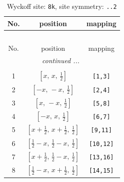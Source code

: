 \documentclass[fleqn,8pt]{jsarticle}
\begin{document}
\begin{longtable}{ccc}
\caption{Wyckoff site: {\tt 8k}, site symmetry: {\tt ..2}}
 \\
 \hline \hline
No. & position & mapping \\ \hline \endfirsthead

\multicolumn{2}{l}{\tablename\ \thetable{}} \\
 \hline \hline
No. & position & mapping \\ \hline \endhead

 \hline \hline
\multicolumn{2}{r}{\footnotesize\it continued ...} \\ \endfoot

 \hline \hline
\multicolumn{2}{r}{} \\ \endlastfoot

1 & $\left[ x,\, x,\, \frac{1}{2} \right]$ & {\tt [1,3]} \\ \hline
2 & $\left[ - x,\, - x,\, \frac{1}{2} \right]$ & {\tt [2,4]} \\ \hline
3 & $\left[ x,\, - x,\, \frac{1}{2} \right]$ & {\tt [5,8]} \\ \hline
4 & $\left[ - x,\, x,\, \frac{1}{2} \right]$ & {\tt [6,7]} \\ \hline
5 & $\left[ x + \frac{1}{2},\, x + \frac{1}{2},\, \frac{1}{2} \right]$ & {\tt [9,11]} \\ \hline
6 & $\left[ \frac{1}{2} - x,\, \frac{1}{2} - x,\, \frac{1}{2} \right]$ & {\tt [10,12]} \\ \hline
7 & $\left[ x + \frac{1}{2},\, \frac{1}{2} - x,\, \frac{1}{2} \right]$ & {\tt [13,16]} \\ \hline
8 & $\left[ \frac{1}{2} - x,\, x + \frac{1}{2},\, \frac{1}{2} \right]$ & {\tt [14,15]} \\
\end{longtable}
\renewcommand{\arraystretch}{1.2}
\end{document}
